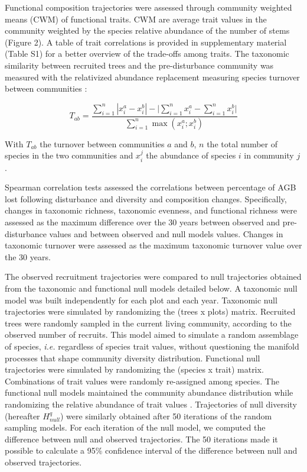 \documentclass[fleqn,10pt]{ArtEcoFoG} %
\begin{document}
Functional composition trajectories were assessed through community weighted means (CWM) of functional traits. CWM are average trait values in the community weighted by the species relative abundance of the number of stems \citep{Diaz2007} (Figure 2).
A table of trait correlations is provided in supplementary material (Table S1) for a better overview of the trade-offs among traits.
The taxonomic similarity between recruited trees and the pre-disturbance community was measured with the relativized abundance replacement measuring species turnover between communities \citep{Podani2013a}:

\begin{equation}
T_{ab}=\frac{\sum_{i=1}^{n}|x_i^a - x_i^b| - \bigg| \sum_{i=1}^{n}{x_i^a} - \sum_{i=1}^{n}{x_i^b} \bigg|}{\sum_{i=1}^{n}\max{\left( x_i^a;x_i^b \right)}}
\label{eq:formNestedness}
\end{equation}

With \(T_{ab}\) the turnover between communities \(a\) and \(b\), \(n\) the total number of species in the two communities and \(x_{i}^{j}\) the abundance of species \(i\) in community \(j\).

Spearman correlation tests assessed the correlations between percentage of AGB lost following disturbance and diversity and composition changes. Specifically, changes in taxonomic richness, taxonomic evenness, and functional richness were assessed as the maximum difference over the 30 years between observed and pre-disturbance values and between observed and null models values. Changes in taxonomic turnover were assessed as the maximum taxonomic turnover value over the 30 years.

The observed recruitment trajectories were compared to null trajectories obtained from the taxonomic and functional null models detailed below. A taxonomic null model was built independently for each plot and each year. Taxonomic null trajectories were simulated by randomizing the (trees x plots) matrix. Recruited trees were randomly sampled in the current living community, according to the observed number of recruits. This model aimed to simulate a random assemblage of species, \emph{i.e.} regardless of species trait values, without questioning the manifold processes that shape community diversity distribution. Functional null trajectories were simulated by randomizing the (species x trait) matrix. Combinations of trait values were randomly re-assigned among species. The functional null models maintained the community abundance distribution while randomizing the relative abundance of trait values \citep{Mason2013}.
Trajectories of null diversity (hereafter \(H^q_{null}\)) were similarly obtained after 50 iterations of the random sampling models.
For each iteration of the null model, we computed the difference between null and observed trajectories. The 50 iterations made it possible to calculate a 95\% confidence interval of the difference between null and observed trajectories.
\end{document}
